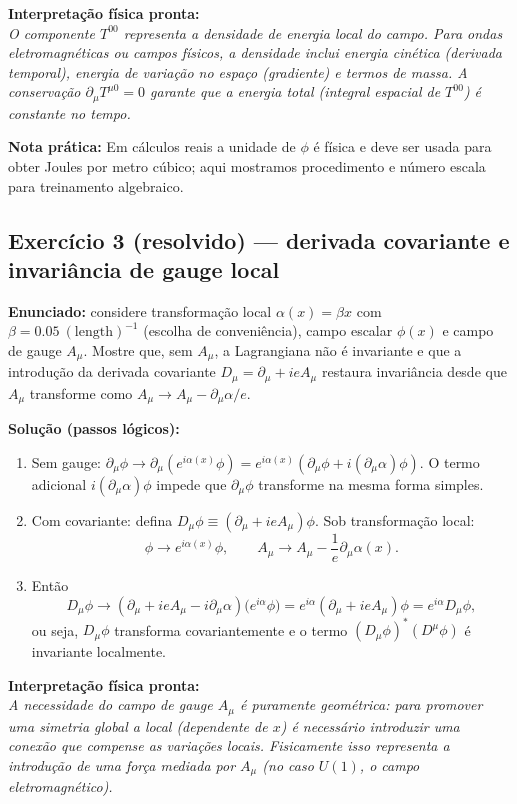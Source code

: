 \documentclass[12pt,a4paper]{article}
\begin{document}
\textbf{Interpretação física pronta:} \\
\emph{O componente $T^{00}$ representa a densidade de energia local do campo. Para ondas eletromagnéticas ou campos físicos, a densidade inclui energia cinética (derivada temporal), energia de variação no espaço (gradiente) e termos de massa. A conservação $\partial_\mu T^{\mu0}=0$ garante que a energia total (integral espacial de $T^{00}$) é constante no tempo.}

\textbf{Nota prática:} Em cálculos reais a unidade de $\phi$ é física e deve ser usada para obter Joules por metro cúbico; aqui mostramos procedimento e número escala para treinamento algebraico.

\subsection{Exercício 3 (resolvido) — derivada covariante e invariância de gauge local}
\textbf{Enunciado:} considere transformação local $\alpha(x)=\beta x$ com $\beta=0.05\ \mathrm{(length)^{-1}}$ (escolha de conveniência), campo escalar $\phi(x)$ e campo de gauge $A_\mu$. Mostre que, sem $A_\mu$, a Lagrangiana não é invariante e que a introdução da derivada covariante $D_\mu=\partial_\mu+i e A_\mu$ restaura invariância desde que $A_\mu$ transforme como $A_\mu\to A_\mu - \partial_\mu\alpha/e$.

\textbf{Solução (passos lógicos):}
\begin{enumerate}
  \item Sem gauge: $\partial_\mu\phi\to \partial_\mu(e^{i\alpha(x)}\phi)=e^{i\alpha(x)}(\partial_\mu\phi + i (\partial_\mu\alpha)\phi)$. O termo adicional $i(\partial_\mu\alpha)\phi$ impede que $\partial_\mu\phi$ transforme na mesma forma simples.
  \item Com covariante: defina $D_\mu\phi\equiv (\partial_\mu + i e A_\mu)\phi$. Sob transformação local:
  \[
  \phi\to e^{i\alpha(x)}\phi,\qquad A_\mu\to A_\mu - \frac{1}{e}\partial_\mu\alpha(x).
  \]
  \item Então
  \[
  D_\mu\phi \to (\partial_\mu + i e A_\mu - i\partial_\mu\alpha)\big(e^{i\alpha}\phi\big)
  = e^{i\alpha}(\partial_\mu + i e A_\mu)\phi = e^{i\alpha} D_\mu\phi,
  \]
  ou seja, $D_\mu\phi$ transforma covariantemente e o termo $(D_\mu\phi)^*(D^\mu\phi)$ é invariante localmente.
\end{enumerate}

\textbf{Interpretação física pronta:} \\
\emph{A necessidade do campo de gauge $A_\mu$ é puramente geométrica: para promover uma simetria global a local (dependente de $x$) é necessário introduzir uma conexão que compense as variações locais. Fisicamente isso representa a introdução de uma força mediada por $A_\mu$ (no caso $U(1)$, o campo eletromagnético).}
\end{document}
